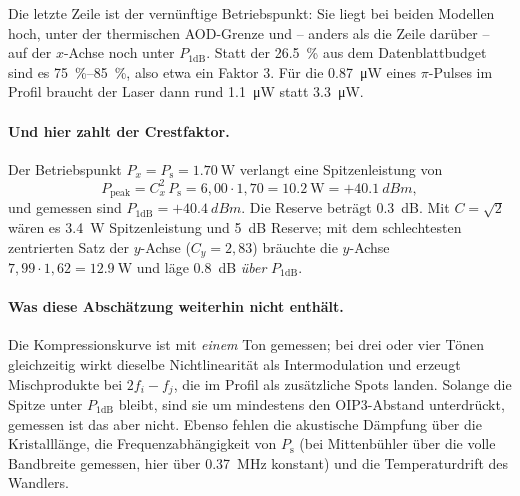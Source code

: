 \documentclass[11pt,a4paper]{article}
\newcommand{\crest}{\ensuremath{C}}
\begin{document}
\noindent Die letzte Zeile ist der vernünftige Betriebspunkt: Sie liegt bei
beiden Modellen hoch, unter der thermischen AOD-Grenze und -- anders als die
Zeile darüber -- auf der $x$-Achse noch unter $P_{1\mathrm{dB}}$. Statt der
\SI{26.5}{\percent} aus dem Datenblattbudget sind es
\SIrange{75}{85}{\percent}, also etwa ein Faktor $3$. Für die
\SI{0.87}{\micro\watt} eines $\pi$-Pulses im Profil braucht der Laser dann
rund \SI{1.1}{\micro\watt} statt \SI{3.3}{\micro\watt}.

\paragraph{Und hier zahlt der Crestfaktor.}
Der Betriebspunkt $P_x = P_\mathrm{s} = \SI{1.70}{\watt}$ verlangt eine
Spitzenleistung von
\begin{equation}
  P_\mathrm{peak} = \crest_x^2\,P_\mathrm{s} = 6{,}00\cdot1{,}70 = \SI{10.2}{\watt}
                  = +\SI{40.1}{dBm},
\end{equation}
und gemessen sind $P_{1\mathrm{dB}} = +\SI{40.4}{dBm}$. Die Reserve beträgt
\SI{0.3}{\deci\bel}. Mit $\crest=\sqrt2$ wären es \SI{3.4}{\watt}
Spitzenleistung und \SI{5}{\deci\bel} Reserve; mit dem schlechtesten
zentrierten Satz der $y$-Achse ($\crest_y=2{,}83$) bräuchte die $y$-Achse
$7{,}99\cdot1{,}62=\SI{12.9}{\watt}$ und läge \SI{0.8}{\deci\bel}
\emph{über} $P_{1\mathrm{dB}}$.

\medskip
\noindent{}
\medskip

\paragraph{Was diese Abschätzung weiterhin nicht enthält.}
Die Kompressionskurve ist mit \emph{einem} Ton gemessen; bei drei oder vier
Tönen gleichzeitig wirkt dieselbe Nichtlinearität als Intermodulation und
erzeugt Mischprodukte bei $2f_i-f_j$, die im Profil als zusätzliche Spots
landen. Solange die Spitze unter $P_{1\mathrm{dB}}$ bleibt, sind sie um
mindestens den OIP3-Abstand unterdrückt, gemessen ist das aber nicht. Ebenso
fehlen die akustische Dämpfung über die Kristalllänge, die
Frequenzabhängigkeit von $P_\mathrm{s}$ (bei Mittenbühler über die
volle Bandbreite gemessen, hier über \SI{0.37}{\mega\hertz} konstant) und die
Temperaturdrift des Wandlers.
\end{document}
